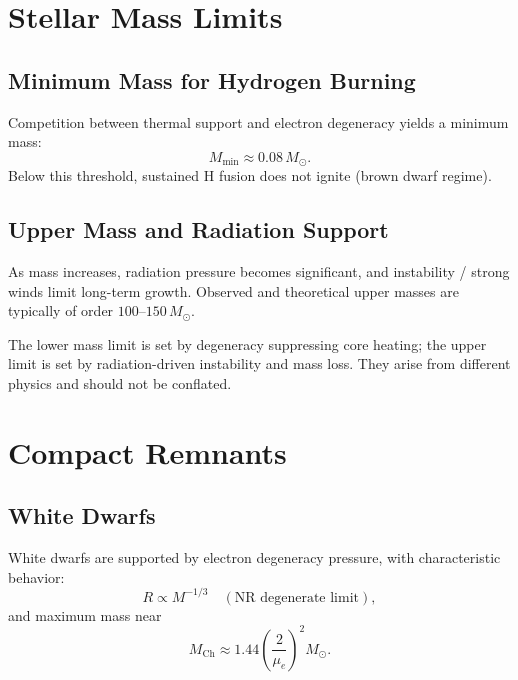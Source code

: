 \section{Stellar Mass Limits}

\subsection{Minimum Mass for Hydrogen Burning}
\begin{theory}
Competition between thermal support and electron degeneracy yields a minimum mass:
\begin{equation}
    M_{\min}\approx 0.08\,M_\odot.
\end{equation}
Below this threshold, sustained H fusion does not ignite (brown dwarf regime).
\end{theory}

\subsection{Upper Mass and Radiation Support}
\begin{theory}
As mass increases, radiation pressure becomes significant, and instability / strong winds limit long-term growth.
Observed and theoretical upper masses are typically of order $100$--$150\,M_\odot$.
\end{theory}

\begin{importantnote}
The lower mass limit is set by degeneracy suppressing core heating;
the upper limit is set by radiation-driven instability and mass loss.
They arise from different physics and should not be conflated.
\end{importantnote}

\section{Compact Remnants}

\subsection{White Dwarfs}
\begin{theory}
White dwarfs are supported by electron degeneracy pressure, with characteristic behavior:
\begin{equation}
    R\propto M^{-1/3}\quad(\text{NR degenerate limit}),
\end{equation}
and maximum mass near
\begin{equation}
    M_{\text{Ch}}\approx 1.44\left(\frac{2}{\mu_e}\right)^2M_\odot.
\end{equation}
\end{theory}

